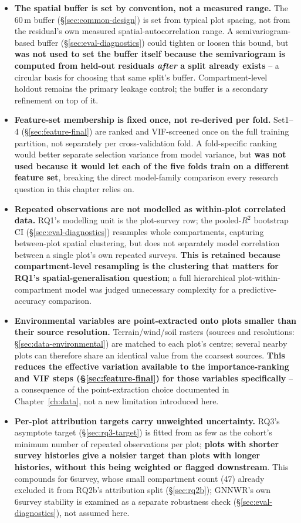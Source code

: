 {\begin{itemize}
\setlength\itemsep{2pt}
\item \textbf{The spatial buffer is set by convention, not a measured range.} The 60\,m buffer (\S\ref{sec:common-design}) is set from typical plot spacing, not from the residual's own measured spatial-autocorrelation range. A semivariogram-based buffer (\S\ref{sec:eval-diagnostics}) could tighten or loosen this bound, but \textbf{was not used to set the buffer itself because the semivariogram is computed from held-out residuals \emph{after} a split already exists} -- a circular basis for choosing that same split's buffer. Compartment-level holdout remains the primary leakage control; the buffer is a secondary refinement on top of it.
\item \textbf{Feature-set membership is fixed once, not re-derived per fold.} Set1--4 (\S\ref{sec:feature-final}) are ranked and VIF-screened once on the full training partition, not separately per cross-validation fold. A fold-specific ranking would better separate selection variance from model variance, but \textbf{was not used because it would let each of the five folds train on a different feature set}, breaking the direct model-family comparison every research question in this chapter relies on.
\item \textbf{Repeated observations are not modelled as within-plot correlated data.} RQ1's modelling unit is the plot-survey row; the pooled-$R^2$ bootstrap CI (\S\ref{sec:eval-diagnostics}) resamples whole compartments, capturing between-plot spatial clustering, but does not separately model correlation between a single plot's own repeated surveys. \textbf{This is retained because compartment-level resampling is the clustering that matters for RQ1's spatial-generalisation question}; a full hierarchical plot-within-compartment model was judged unnecessary complexity for a predictive-accuracy comparison.
\item \textbf{Environmental variables are point-extracted onto plots smaller than their source resolution.} Terrain/wind/soil rasters (sources and resolutions: \S\ref{sec:data-environmental}) are matched to each plot's centre; several nearby plots can therefore share an identical value from the coarsest sources. \textbf{This reduces the effective variation available to the importance-ranking and VIF steps (\S\ref{sec:feature-final}) for those variables specifically} -- a consequence of the point-extraction choice documented in Chapter~\ref{ch:data}, not a new limitation introduced here.
\item \textbf{Per-plot attribution targets carry unweighted uncertainty.} RQ3's asymptote target (\S\ref{sec:rq3-target}) is fitted from as few as the cohort's minimum number of repeated observations per plot; \textbf{plots with shorter survey histories give a noisier target than plots with longer histories, without this being weighted or flagged downstream}. This compounds for 6survey, whose small compartment count (47) already excluded it from RQ2b's attribution split (\S\ref{sec:rq2b}); GNNWR's own 6survey stability is examined as a separate robustness check (\S\ref{sec:eval-diagnostics}), not assumed here.

\end{itemize}}
